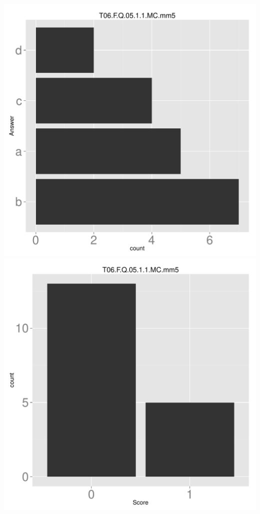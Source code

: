 \documentclass[12pt,nohyper]{tufte-handout}\usepackage[]{graphicx}\usepackage[]{color}
\begin{document}
\begin{center} \includegraphics[width=.45\linewidth]{Topic06_65_answer} \includegraphics[width=.45\linewidth]{Topic06_65_score} \end{center} 
\end{document}
